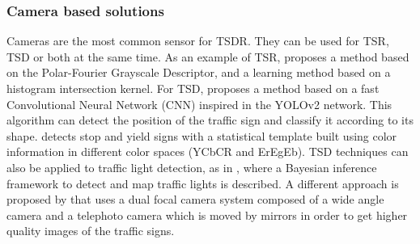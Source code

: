 \documentclass[journal]{IEEEtran}
\begin{document}
\subsubsection{Camera based solutions}
Cameras are the most common sensor for TSDR. They can be used for TSR, TSD or both at the same time.
As an example of TSR, \cite{frejlichowski2015application} proposes a method 
based on the Polar-Fourier Grayscale Descriptor, and \cite{gao2015learning} a 
learning method based on a histogram intersection kernel.
For TSD, \cite{zhang2017real} proposes a method based on a fast Convolutional 
Neural Network (CNN) inspired in the YOLOv2 network. This algorithm 
can detect the position of the traffic sign and classify it according to its shape. 
\cite{villalon2017traffic} detects stop and yield signs with a statistical 
template built using color information in different color spaces (YCbCR and ErEgEb).
TSD techniques can also be applied to traffic light detection, as in 
\cite{hosseinyalamdary2017bayesian}, where a Bayesian inference framework to 
detect and map traffic lights is described. A different approach is proposed by 
\cite{gu2011traffic} that uses a dual focal camera system composed of a wide 
angle camera and a telephoto camera which is moved by mirrors 
in order to get higher quality images of the traffic signs.
\end{document}
